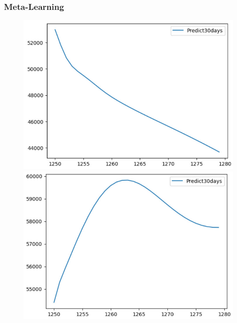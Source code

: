 \subsubsection{Meta-Learning}
\begin{figure}[H]
    \centering
    \begin{minipage}{0.15\textwidth}
    \centering
    \includegraphics[width=1\textwidth]{resources/chapter-5/predicted/BIDV_LSTM_7_3_next30days.jpg}
    \end{minipage}
    \hfill
    \begin{minipage}{0.15\textwidth}
    \centering
    \includegraphics[width=1\textwidth]{resources/chapter-5/predicted/BIDV_LSTM_8_2_next30days.jpg}
    \end{minipage}
    \hfill
        \begin{minipage}{0.15\textwidth}

\end{minipage}
\end{figure}
